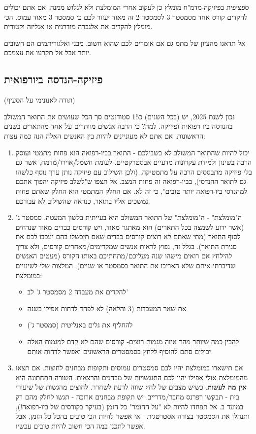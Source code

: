 \documentclass[a4paper,12pt]{article}
\begin{document}
ספציפית בפיזיקה-מדמ"ח מומלץ כן לעקוב אחרי המומלצת ולא לגלוש ממנה. אם אתם יכולים להקדים קורס אחד מסמסטר 3 לסמסטר 2 זה מאוד יעזור לכם כי סמסטר 3 מאוד עמוס. הכי מומלץ להקדים את אלגברה מודרנית או אנליזה וקטורית.

אל תדאגו מהציון של מתמ גם אם אומרים לכם שהוא חשוב. מבני ואלגוריתמים הם חשובים יותר אבל אל תקרעו את עצמכם.

\subsection{פיזיקה-הנדסה ביורפואית}

(תודה לאנונימי על הסעיף)

נכון לשנת 2025, יש (בכל השנים) כ15 סטודנטים סך הכל שעושים את התואר המשולב בהנדסה ביו-רפואית ופיזיקה. למה? כי הרבה אנשים מוותרים על אחד מהתארים בשנים הראשונות. אם אתם לא מעוניינים להיות בין האנשים האלה הנה כמה עצות:

\begin{enumerate}
    \item יכול להיות שהתואר המשולב לא בשבילכם - 
התואר בביו-רפואה הוא פחות מתמטי ועוסק הרבה בשינון ולמידת עקרונות מדעיים אבסטרקטיים. לעומת חשמל/אוירו/מדמח, אשר גם בלי פיזיקה מתבססים הרבה על מתמטיקה, (ולכן השילוב עם פיזיקה נותן ערך נוסף כלשהו גם לתואר ההנדסי), בביו-רפואה זה פחות המצב. אל תצפו ש"לשלב פיזיקה יהפוך אתכם למהנדסי ביו-רפואה יותר טובים", כי זה לא. אם החלק המתמטי הוא החלק שאתם פחות נמשכים אליו בתואר, כנראה שהשילוב לא עבורכם.
    \item ה"מומלצת" -
    ה"מומלצת" של התואר המשולב היא בעייתית בלשון המעטה. סמסטר ג' (אשר ידוע לשמצה בכל התארים) הוא מאתגר מאוד, ויש קורסים כבדים מאוד שנדחים לסוף התואר (מתי שאתם לא רוצים קורסים כבדים שאם תיכשלו בהם יעכבו לכם את סגירת התואר). בגלל זה, נפוץ לראות אנשים שמקדימים/מאחרים קורסים, ולא צריך להילחץ אם רואים מישהו שנה מעליכם/מתחתיכם באותו הקורס (מעטים האנשים שדיברתי איתם שלא האריכו את התואר בסמסטר או שניים). המלצות שלי לשינויים במומלצת:
    \begin{itemize}
        \item להקדים את מעבדה 2 מסמסטר ג' לב'
        \item את שאר המעבדות (3 והלאה) לא לפחד לדחות אפילו בשנה
        \item להחליף את גלים באנליטית (סמסטר ג')
        \item להבין כמה שיותר מהר איזה מגמות רוצים- קורסים שהם לא קדם למגמות האלה יכולים סתם להוסיף ללחץ בסמסטרים הראשונים ואפשר לדחות אותם.
    \end{itemize}
    \item אם תישארו במומלצת יהיו לכם סמסטרים עמוסים ותקופות מבחנים לחוצות. אם תצאו מהמומלצת אולי אפילו יהיו לכם התנגשויות של מבחנים והרצאות. השורה התחתונה היא \textbf{אין מה לעשות}. כשיש מצבים של לחץ שווה לדעת לשחרר. לחוצים מהגשות של שיעורי בית - תבקשו רפרנס מחבר/מדרייב. יש תקופת מבחנים ארוכה - תגשו לחלק מהם רק במועד ב. אל תפחדו להיות לא "על החומר" כל הזמן (בעיקר בקורסים של ביו-רפואה!), ותנהלו את הסמסטר בצורה אסטרטגית - אי אפשר להיות הכי טובים בהכל כל הזמן, אבל אפשר לתכנן במה הכי חשוב להיות טובים עכשיו.
\end{enumerate}
\end{document}
